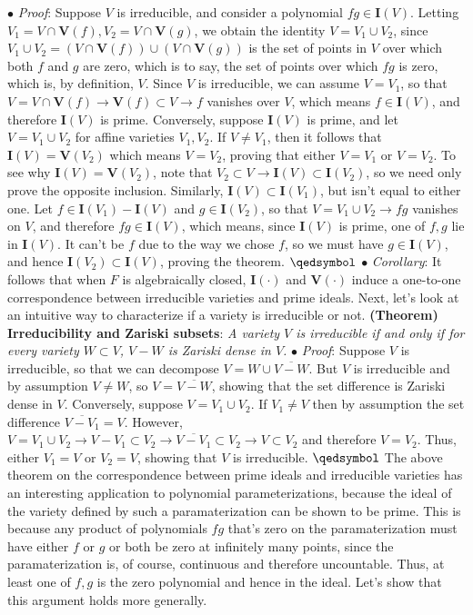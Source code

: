 \documentclass{article}
\newcommand*{\tb}{\textbf}
\newcommand*{\ti}{\textit}
\newcommand*{\n}{\newline}
\newcommand*{\nn}{\newline \newline}
\newcommand*{\Pf}{\indent \ensuremath{\bullet} \textit{Proof}: }
\newcommand*{\V}{\ensuremath{\mathbf{V}}}
\newcommand*{\I}{\ensuremath{\mathbf{I}}}
\begin{document}
\n
\indent $ \bullet $ \ti{Proof}: Suppose $ V $ is irreducible, and consider a polynomial $ f g \in \I(V) $. Letting $ V_1 = V \cap \V(f), V_2 = V \cap \V(g) $, we obtain the identity $ V = V_1 \cup V_2 $, since $ V_1 \cup V_2 = (V \cap \V(f)) \cup (V \cap \V(g)) $ is the set of points in $ V $ over which both $ f $ and $ g $ are zero, which is to say, the set of points over which $ f g $ is zero, which is, by definition, $ V $. Since $ V $ is irreducible, we can assume $ V = V_1 $, so that $ V = V \cap \V(f) \rightarrow \V(f) \subset V \rightarrow f $ vanishes over $ V $, which means $ f \in \I(V) $, and therefore $ \I(V) $ is prime.
\n
\indent Conversely, suppose $ \I(V) $ is prime, and let $ V = V_1 \cup V_2 $ for affine varieties $ V_1, V_2 $. If $ V \neq V_1 $, then it follows that $ \I(V) = \V(V_2) $ which means $ V = V_2 $, proving that either $ V = V_1 $ or $ V = V_2 $. To see why $ \I(V) = \V(V_2) $, note that $ V_2 \subset V \rightarrow \I(V) \subset \I(V_2) $, so we need only prove the opposite inclusion. Similarly, $ \I(V) \subset \I(V_1) $, but isn't equal to either one. Let $ f \in \I(V_1) - \I(V) $ and $ g \in \I(V_2) $, so that $ V = V_1 \cup V_2 \rightarrow f g $ vanishes on $ V $, and therefore $ f g \in \I(V) $, which means, since $ \I(V) $ is prime, one of $ f, g $ lie in $ \I(V) $. It can't be $ f $ due to the way we chose $ f $, so we must have $ g \in \I(V) $, and hence $ \I(V_2) \subset \I(V) $, proving the theorem. $ \qedsymbol $
\n
\indent $ \bullet $ \ti{Corollary}: It follows that when $ F $ is algebraically closed, $ \I(\cdot) $ and $ \V(\cdot) $ induce a one-to-one correspondence between irreducible varieties and prime ideals.
\nn
Next, let's look at an intuitive way to characterize if a variety is irreducible or not.
\nn
\tb{(Theorem) Irreducibility and Zariski subsets}: \ti{A variety $ V $ is irreducible if and only if for every variety $ W \subset V $, $ V - W $ is Zariski dense in $ V $.}
\n
\Pf Suppose $ V $ is irreducible, so that we can decompose $ V = W \cup \overline{V - W} $. But $ V $ is irreducible and by assumption $ V \neq W $, so $ V = \overline{V - W} $, showing that the set difference is Zariski dense in $ V $. Conversely, suppose $ V = V_1 \cup V_2 $. If $ V_1 \neq V $ then by assumption the set difference $ \overline{V - V_1} = V $. However, $ V = V_1 \cup V_2 \rightarrow V - V_1 \subset V_2 \rightarrow \overline{V - V_1} \subset V_2 \rightarrow V \subset V_2 $ and therefore $ V = V_2 $. Thus, either $ V_1 = V $ or $ V_2 = V $, showing that $ V $ is irreducible. $ \qedsymbol $
\nn
The above theorem on the correspondence between prime ideals and irreducible varieties has an interesting application to polynomial parameterizations, because the ideal of the variety defined by such a paramaterization can be shown to be prime. This is because any product of polynomials $ f g $ that's zero on the paramaterization must have either $ f $ or $ g $ or both be zero at infinitely many points, since the paramaterization is, of course, continuous and therefore uncountable. Thus, at least one of $ f, g $ is the zero polynomial and hence in the ideal. Let's show that this argument holds more generally.
\end{document}
